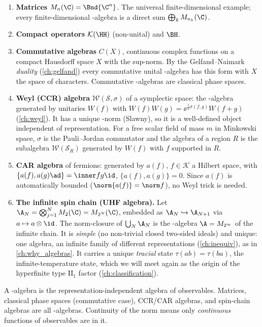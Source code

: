 \begin{enumerate}
\item \textbf{Matrices} $M_n(\C)=\Bnd{\C^n}$. The universal finite-dimensional example; every finite-dimensional \cstar-algebra is a direct sum $\bigoplus_kM_{n_k}(\C)$.
\item \textbf{Compact operators} $\mathcal K(\HH)$ (non-unital) and $\BH$.
\item \textbf{Commutative algebras} $C(X)$, continuous complex functions on a compact Hausdorff space $X$ with the sup-norm. By the Gelfand--Naimark \emph{duality} (\cref{ch:gelfand}) every commutative unital \cstar-algebra has this form with $X$ the space of characters. Commutative \cstar-algebras are classical phase spaces.
\item \textbf{Weyl (CCR) algebra} $\mathcal W(\mathcal S,\sigma)$ of a symplectic space: the \cstar-algebra generated by unitaries $W(f)$ with $W(f)W(g)=\ee^{\frac\ii2\sigma(f,g)}W(f+g)$ (\cref{ch:weyl}). It has a unique \cstar-norm (Slawny), so it is a well-defined object independent of representation. For a free scalar field of mass $m$ in Minkowski space, $\sigma$ is the Pauli--Jordan commutator and the algebra of a region $R$ is the subalgebra $\mathcal W(\mathcal S_R)$ generated by $W(f)$ with $f$ supported in $R$.
\item \textbf{CAR algebra} of fermions: generated by $a(f)$, $f\in\mathcal K$ a Hilbert space, with $\{a(f),a(g)\ad\}=\inner fg\id$, $\{a(f),a(g)\}=0$. Since $a(f)$ is automatically bounded ($\norm{a(f)}=\norm f$), no Weyl trick is needed.
\item \textbf{The infinite spin chain (UHF algebra).} Let $\A_N=\bigotimes_{j=1}^NM_2(\C)=M_{2^N}(\C)$, embedded as $\A_N\hookrightarrow\A_{N+1}$ via $a\mapsto a\otimes\id$. The norm-closure of $\bigcup_N\A_N$ is the \cstar-algebra $\A=M_{2^\infty}$ of the infinite chain. It is \emph{simple} (no non-trivial closed two-sided ideals) and unique: one algebra, an infinite family of different representations (\cref{ch:inequiv}), as in \cref{ch:why_algebras}. It carries a unique \emph{tracial} state $\tau(ab)=\tau(ba)$, the infinite-temperature state, which we will meet again as the origin of the hyperfinite type II$_1$ factor (\cref{ch:classification}).
\end{enumerate}

\begin{keyidea}
A \cstar-algebra is the representation-independent algebra of observables. Matrices, classical phase spaces (commutative case), CCR/CAR algebras, and spin-chain algebras are all \cstar-algebras. Continuity of the norm means only \emph{continuous} functions of observables are in it.
\end{keyidea}

